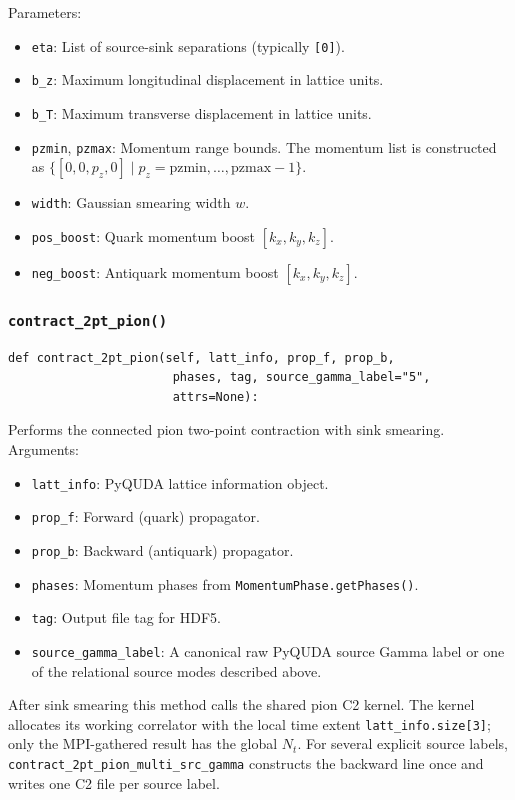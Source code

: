 \documentclass[11pt]{article}
\begin{document}
Parameters:
\begin{itemize}
    \item \texttt{eta}: List of source-sink separations (typically \texttt{[0]}).
    \item \texttt{b\_z}: Maximum longitudinal displacement in lattice units.
    \item \texttt{b\_T}: Maximum transverse displacement in lattice units.
    \item \texttt{pzmin}, \texttt{pzmax}: Momentum range bounds. The momentum list is constructed as $\{[0, 0, p_z, 0] \mid p_z = \text{pzmin}, \dots, \text{pzmax}-1\}$.
    \item \texttt{width}: Gaussian smearing width $w$.
    \item \texttt{pos\_boost}: Quark momentum boost $[k_x, k_y, k_z]$.
    \item \texttt{neg\_boost}: Antiquark momentum boost $[k_x, k_y, k_z]$.
\end{itemize}

\subsubsection{\texttt{contract\_2pt\_pion()}}

\begin{lstlisting}
def contract_2pt_pion(self, latt_info, prop_f, prop_b,
                       phases, tag, source_gamma_label="5",
                       attrs=None):
\end{lstlisting}

Performs the connected pion two-point contraction with sink smearing. Arguments:
\begin{itemize}
    \item \texttt{latt\_info}: PyQUDA lattice information object.
    \item \texttt{prop\_f}: Forward (quark) propagator.
    \item \texttt{prop\_b}: Backward (antiquark) propagator.
    \item \texttt{phases}: Momentum phases from \texttt{MomentumPhase.getPhases()}.
    \item \texttt{tag}: Output file tag for HDF5.
    \item \texttt{source\_gamma\_label}: A canonical raw PyQUDA source Gamma
    label or one of the relational source modes described above.
\end{itemize}

After sink smearing this method calls the shared pion C2 kernel.  The kernel
allocates its working correlator with the local time extent
\texttt{latt\_info.size[3]}; only the MPI-gathered result has the global
$N_t$.  For several explicit
source labels, \texttt{contract\_2pt\_pion\_multi\_src\_gamma} constructs the
backward line once and writes one C2 file per source label.
\end{document}
